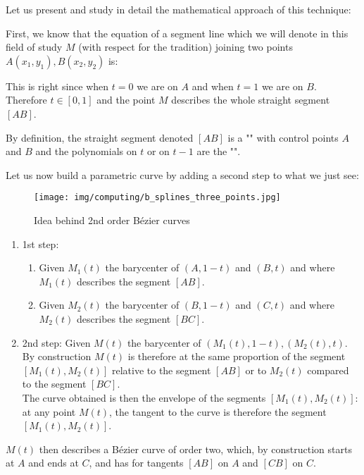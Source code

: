 	Let us present and study in detail the mathematical approach of this technique:
	
	First, we know that the equation of a segment line which we will denote in this field of study $M$ (with respect for the tradition) joining two points $A(x_1,y_1),B(x_2,y_2)$ is:
	
	This is right since when $t=0$ we are on $A$ and when $t=1$ we are on $B$. Therefore $t\in[0,1]$ and the point $M$ describes the whole straight segment $[AB]$.
	
	By definition, the straight segment denoted $[AB]$ is a "" with control points $A$ and $B$ and the polynomials on $t$ or on $t-1$ are the "".
	
	Let us now build a parametric curve by adding a second step to what we just see:
	\begin{figure}[H]
		\centering
		\texttt{[image: img/computing/b\_splines\_three\_points.jpg]}
		\caption{Idea behind 2nd order Bézier curves}
	\end{figure}
	\begin{enumerate}
		\item 1st step:
		\begin{enumerate}
			\item Given $M_1(t)$ the barycenter of $(A,1-t)$ and $(B,t)$ and where $M_1(t)$ describes the segment $[AB]$.
			\item  Given $M_2(t)$ the barycenter of $(B,1-t)$ and $(C,t)$ and where $M_2(t)$ describes the segment $[BC]$.
		\end{enumerate}
		\item 2nd step:
		Given $M(t)$ the barycenter of $(M_1(t),1-t),(M_2(t),t)$.\\
			
		By construction $M (t)$ is therefore at the same proportion of the segment $[M_1(t),M_2(t)]$ relative to the segment $[AB]$ or to $M_2(t)$ compared to the segment $[BC]$.\\
			
		The curve obtained is then the envelope of the segments $[M_1(t),M_2(t)]$: at any point $M(t)$, the tangent to the curve is therefore the segment $[M_1(t),M_2(t)]$.
	\end{enumerate}
	$M (t)$ then describes a Bézier curve of order two, which, by construction starts at $A$ and ends at $C$, and has for tangents $[AB]$ on $A$ and $[CB]$ on $C$.
	
